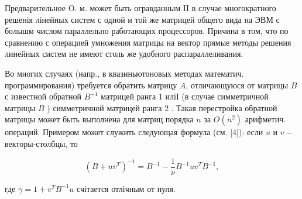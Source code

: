 \documentclass[10pt]{article}
\begin{document}
Предварительное O. м. может быть огравданным II в случае многократного решенія лінейных систем с одной и той же матрицей общего вида на ЭВМ с болышм числом параллельно работающих процессоров. Причина в том, что по сравнению с операцией умножения матрицы на вектор прямые методы решения линейных систем не имеют столь же удобного распараллеливания.



Во многих случаях (напр., в квазиньютоновых методах математич. программирования) требуется обратить матрицу $A$, отличающуюся от матрицы $B$ с известной обратной $B^{-1}$ матрицей ранга 1 иліІ (в случае симметричной матрицы $B$ ) симметричной матрицей ранга 2 . Такая перестройка обратной матрицы может быть выполнена для матриц порядка $n$ за $O\left(n^{2}\right)$ арифметич. операций. Примером может служить следующая формула (см. [4]): если $u$ и $v-$ векторы-столбцы, то



\[

\left(B+u v^{T}\right)^{-1}=B^{-1}-\frac{1}{\nu} B^{-1} u v^{T} B^{-1},

\]



где $\gamma=1+v^{T} B^{-1} u$ счітается отлічным от нуля.
\end{document}

